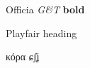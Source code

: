 \documentclass{article}
\begin{document}
Officia \textit{G\&T} \textbf{bold}

{\headfont Playfair heading}

{\ipafont κόρα ɕʃʝ}
\end{document}
